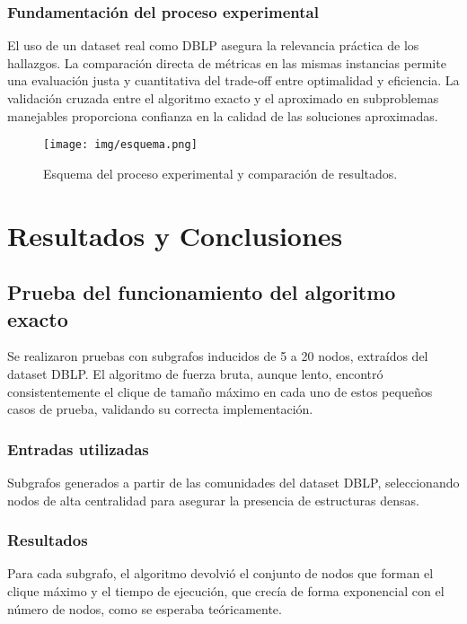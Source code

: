 \documentclass[12pt,a4paper]{report}
\begin{document}
\subsection{Fundamentación del proceso experimental}
El uso de un dataset real como DBLP asegura la relevancia práctica de los hallazgos. La comparación directa de métricas en las mismas instancias permite una evaluación justa y cuantitativa del trade-off entre optimalidad y eficiencia. La validación cruzada entre el algoritmo exacto y el aproximado en subproblemas manejables proporciona confianza en la calidad de las soluciones aproximadas.

\begin{figure}[H]
    \centering
    \texttt{[image: img/esquema.png]}
    \caption{Esquema del proceso experimental y comparación de resultados.}
    \label{fig:esquema_experimental}
\end{figure}

\newpage

\chapter{Resultados y Conclusiones}

\section{Prueba del funcionamiento del algoritmo exacto}
Se realizaron pruebas con subgrafos inducidos de 5 a 20 nodos, extraídos del dataset DBLP. El algoritmo de fuerza bruta, aunque lento, encontró consistentemente el clique de tamaño máximo en cada uno de estos pequeños casos de prueba, validando su correcta implementación.

\subsection{Entradas utilizadas}
Subgrafos generados a partir de las comunidades del dataset DBLP, seleccionando nodos de alta centralidad para asegurar la presencia de estructuras densas.

\subsection{Resultados}
Para cada subgrafo, el algoritmo devolvió el conjunto de nodos que forman el clique máximo y el tiempo de ejecución, que crecía de forma exponencial con el número de nodos, como se esperaba teóricamente.
\end{document}

